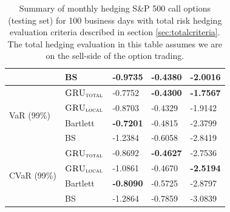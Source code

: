 \documentclass[letterpaper,12pt,titlepage,oneside,final]{book}
\numberwithin{equation}{section}
\theoremstyle{definition}
\newcommand{\modelT}{\textsc{GRU}_{\textsc{total}}}
\newcommand{\modelL}{\textsc{GRU}_{\textsc{local}}}
\begin{document}
\begin{table}[htp!]
\begin{tabular}{ll|l|l|l|}
		\multicolumn{1}{|l|}{}                                & BS       & -0.9735          & -0.4380          & -2.0016          \\ \hline
		\multicolumn{1}{|l|}{\multirow{4}{*}{VaR (99\%)}}     & $\modelT$    & -0.7752          & \textbf{-0.4300} & \textbf{-1.7567} \\  
		\multicolumn{1}{|l|}{}                                & $\modelL$    & -0.8703          & -0.4329          & -1.9142          \\  
		\multicolumn{1}{|l|}{}                                & Bartlett & \textbf{-0.7201} & -0.4815          & -2.3799          \\  
		\multicolumn{1}{|l|}{}                                & BS       & -1.2384          & -0.6058          & -2.8419          \\ \hline
		\multicolumn{1}{|l|}{\multirow{4}{*}{CVaR (99\%)}}    & $\modelT$    & -0.8692          & \textbf{-0.4627} & -2.7536          \\  
		\multicolumn{1}{|l|}{}                                & $\modelL$    & -1.0861          & -0.4670          & \textbf{-2.5194} \\  
		\multicolumn{1}{|l|}{}                                & Bartlett & \textbf{-0.8090}  & -0.5725          & -2.8797          \\  
		\multicolumn{1}{|l|}{}                                & BS       & -1.2864          & -0.7859          & -3.0839          \\ \hline
	\end{tabular}
	\caption{Summary of monthly hedging S\&P 500 call options (testing set) for 100 business days with total risk hedging evaluation criteria described in  section \ref{sec:totalcriteria}. The total hedging evaluation in this table assumes we are on the sell-side of the option trading.} \label{table:CallTotalM}
\end{table}
\end{document}
